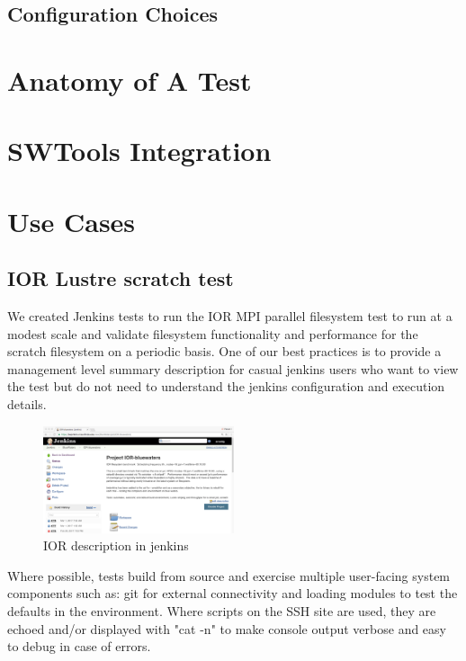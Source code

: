 \documentclass[10pt, conference, compsocconf]{IEEEtran}
\begin{document}
{\subsection{Configuration Choices}

\section{Anatomy of A Test}
\label{sec:TestAnatomy}


\section{SWTools Integration}
\label{sec:SWToolsIntegration}


\section{Use Cases}
\label{sec:results}
\subsection{IOR Lustre scratch test}
We created Jenkins tests to run the IOR MPI parallel filesystem test to run at a modest scale and validate filesystem functionality and performance for the scratch filesystem on a periodic basis.   One of our best practices is to provide a management level summary description for casual jenkins users who want to view the test but do not need to understand the jenkins configuration and execution details.  
\begin{figure}[h!]
\centering
\includegraphics[width=0.5\textwidth]{IOR-bluewaters-descr}
\caption{ IOR description in jenkins }
\label{fig:IOR-bluewaters-descr}
\end{figure}
Where possible, tests build from source and exercise multiple user-facing system components such as: git for external connectivity and loading modules to test the defaults in the environment.  Where scripts on the SSH site are used, they are echoed and/or displayed with "cat -n" to make console output verbose and easy to debug in case of errors.  

}
\end{document}
